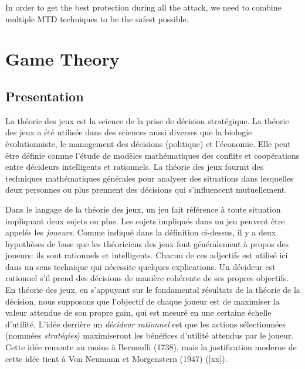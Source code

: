 In order to get the best protection during all the attack, we need to
combine multiple MTD techniques to be the safest possible.




\newpage
\section {Game Theory}

\subsection{Presentation}



{\Huge L}a th\'eorie des jeux est la science de la prise de d\'ecision strat\'egique. La th\'eorie des jeux a \'et\'e utilis\'ee dans des sciences aussi diverses que la biologie \'evolutionniste, le management des d\'ecisions (politique) et l'\'economie. Elle peut \^etre d\'efinie comme l'\'etude de mod\`eles math\'ematiques des conflits et coop\'erations entre d\'ecideurs intelligents et rationnels.
La th\'eorie des jeux fournit des techniques math\'ematiques g\'en\'erales pour analyser des situations dans lesquelles deux personnes ou plus prennent des d\'ecisions qui s'influencent mutuellement.

Dans le langage de la th\'eorie des jeux, un jeu fait r\'ef\'erence \`a toute situation impliquant deux sujets ou plus. Les sujets impliqu\'es dans un jeu peuvent \^etre appel\'es les \emph{joueurs}. Comme indiqu\'e dans la d\'efinition ci-dessus, il y a deux hypoth\`eses de base que les th\'eoriciens des jeux font g\'en\'eralement \`a propos des joueurs: ils sont rationnels et intelligents. 
Chacun de ces adjectifs est utilis\'e ici dans un sens technique qui n\'ecessite quelques explications. Un d\'ecideur est rationnel s'il prend des d\'ecisions de mani\`ere coh\'erente de ses propres objectifs. En th\'eorie des jeux, en s'appuyant sur le fondamental r\'esultats de la th\'eorie de la d\'ecision, nous supposons que l'objectif de chaque joueur est de maximiser la valeur attendue de son propre gain, qui est mesur\'e en une certaine \'echelle d'utilit\'e. L'id\'ee derri\`ere un \emph{d\'ecideur rationnel} est que les actions s\'electionn\'ees (nomm\'ees \emph{strat\'egies}) maximiseront les b\'en\'efices d'utilit\'e attendus par le joueur. Cette id\'ee remonte au moins \`a Bernoulli (1738), mais la justification moderne de cette id\'ee tient \`a Von Neumann et Morgenstern (1947) ([xx]).

